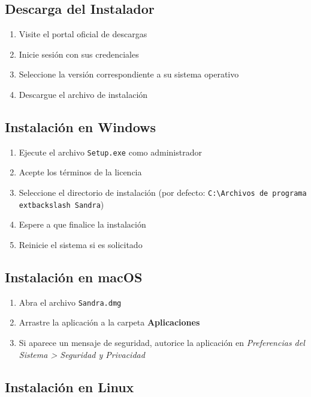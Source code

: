 \subsection{Descarga del Instalador}

\begin{enumerate}
    \item Visite el portal oficial de descargas
    \item Inicie sesión con sus credenciales
    \item Seleccione la versión correspondiente a su sistema operativo
    \item Descargue el archivo de instalación
\end{enumerate}

\subsection{Instalación en Windows}

\begin{enumerate}
    \item Ejecute el archivo \texttt{Setup.exe} como administrador
    \item Acepte los términos de la licencia
    \item Seleccione el directorio de instalación (por defecto: \texttt{C:\textbackslash Archivos de programa	extbackslash Sandra})
    \item Espere a que finalice la instalación
    \item Reinicie el sistema si es solicitado
\end{enumerate}

\subsection{Instalación en macOS}

\begin{enumerate}
    \item Abra el archivo \texttt{Sandra.dmg}
    \item Arrastre la aplicación a la carpeta \textbf{Aplicaciones}
    \item Si aparece un mensaje de seguridad, autorice la aplicación en \textit{Preferencias del Sistema > Seguridad y Privacidad}
\end{enumerate}

\subsection{Instalación en Linux}

